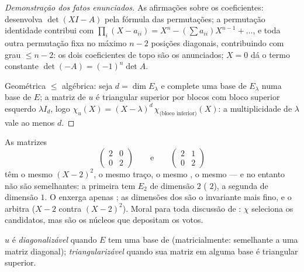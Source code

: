 \begin{proof}[Demonstração dos fatos enunciados]
As afirmações sobre os coeficientes: desenvolva $\det(XI - A)$ pela fórmula das
permutações; a permutação identidade contribui com $\prod_i (X - a_{ii})
= X^n - (\sum a_{ii})X^{n-1} + \dots$, e toda outra permutação
fixa no máximo $n - 2$ posições diagonais, contribuindo com grau $\leq
n - 2$: os dois coeficientes de topo são os anunciados; $X = 0$ dá o
termo constante $\det(-A) = (-1)^n\det A$.

Geométrica $\leq$ algébrica: seja $d = \dim E_\lambda$ e complete uma
base de $E_\lambda$ numa base de $E$; a matriz de $u$ é triangular
superior por blocos com bloco superior esquerdo $\lambda I_d$, logo $\chi_u(X) =
(X - \lambda)^d\, \chi_{\text{(bloco inferior)}}(X)$: a multiplicidade
de $\lambda$ vale ao menos $d$.
\end{proof}

\begin{example}\label{ex:b2:reduction:samechi}
As matrizes
\[
\begin{pmatrix}2 & 0\\ 0 & 2\end{pmatrix}
\qquad\text{e}\qquad
\begin{pmatrix}2 & 1\\ 0 & 2\end{pmatrix}
\]
têm o mesmo  $(X - 2)^2$, o mesmo traço, o mesmo
, o mesmo  --- e no entanto não são semelhantes: a primeira tem
$E_2$ de dimensão $2$ ( $2$), a segunda
de dimensão $1$. O  enxerga apenas
; as dimensões dos  são o
invariante mais fino, e o  arbitra ($X - 2$
contra $(X - 2)^2$). Moral para toda discussão de
: $\chi$ seleciona os candidatos, mas são os núcleos que
depositam os votos.
\end{example}

\begin{definition}\label{def:b2:reduction:diag}
$u$ é \emph{diagonalizável} quando $E$ tem uma
base de  (matricialmente: semelhante a uma matriz diagonal);
\emph{triangularizável} quando sua matriz em alguma
base é triangular superior.
\end{definition}

